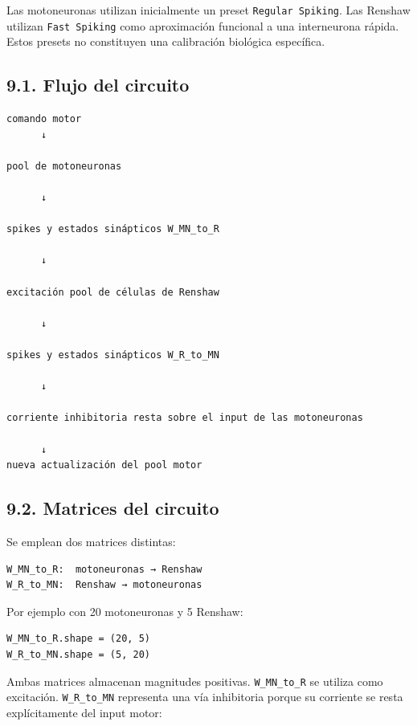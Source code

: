 \documentclass[11pt,a4paper]{article}
\begin{document}
Las motoneuronas utilizan inicialmente un preset
\texttt{Regular\ Spiking}. Las Renshaw utilizan \texttt{Fast\ Spiking}
como aproximación funcional a una interneurona rápida. Estos presets no
constituyen una calibración biológica específica.

\hypertarget{flujo-del-circuito}{%
\subsection{9.1. Flujo del circuito}\label{flujo-del-circuito}}

\begin{lstlisting}
comando motor
      ↓

pool de motoneuronas

      ↓ 

spikes y estados sinápticos W_MN_to_R

      ↓ 

excitación pool de células de Renshaw

      ↓ 

spikes y estados sinápticos W_R_to_MN

      ↓ 

corriente inhibitoria resta sobre el input de las motoneuronas

      ↓
nueva actualización del pool motor
\end{lstlisting}

\hypertarget{matrices-del-circuito}{%
\subsection{9.2. Matrices del circuito}\label{matrices-del-circuito}}

Se emplean dos matrices distintas:

\begin{lstlisting}
W_MN_to_R:  motoneuronas → Renshaw
W_R_to_MN:  Renshaw → motoneuronas
\end{lstlisting}

Por ejemplo con 20 motoneuronas y 5 Renshaw:

\begin{lstlisting}
W_MN_to_R.shape = (20, 5)
W_R_to_MN.shape = (5, 20)
\end{lstlisting}

Ambas matrices almacenan magnitudes positivas. \texttt{W\_MN\_to\_R} se
utiliza como excitación. \texttt{W\_R\_to\_MN} representa una vía
inhibitoria porque su corriente se resta explícitamente del input motor:
\end{document}
